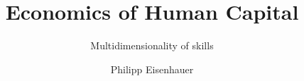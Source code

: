 

\title{Economics of Human Capital}
\subtitle{\vspace{0.3cm}Multidimensionality of skills}
\author{Philipp Eisenhauer}

\date{}

\let\otp\titlepage
